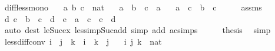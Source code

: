\begin{isabellebody}
\begin{isamarkuptext}
\end{isamarkuptext}\isamarkuptrue%
\isamarkupfalse%
\ diff{\isacharunderscore}{\kern0pt}less{\isacharunderscore}{\kern0pt}mono{\isacharcolon}{\kern0pt}\isanewline
\ \ \ a\ b\ c\ {\isacharcolon}{\kern0pt}{\isacharcolon}{\kern0pt}\ nat\isanewline
\ \ \ {\isachardoublequoteopen}a\ {\isacharless}{\kern0pt}\ b{\isachardoublequoteclose}\ \ {\isachardoublequoteopen}c\ {\isasymle}\ a{\isachardoublequoteclose}\isanewline
\ \ \ {\isachardoublequoteopen}a\ {\isacharminus}{\kern0pt}\ c\ {\isacharless}{\kern0pt}\ b\ {\isacharminus}{\kern0pt}\ c{\isachardoublequoteclose}\isanewline
%
\isadelimproof
%
\endisadelimproof
%
\isatagproof
{}\isamarkupfalse%
\ {\isacharminus}{\kern0pt}\isanewline
\ \ \isamarkupfalse%
\ assms\ \isamarkupfalse%
\ d\ e\ \ {\isachardoublequoteopen}b\ {\isacharequal}{\kern0pt}\ c\ {\isacharplus}{\kern0pt}\ {\isacharparenleft}{\kern0pt}d\ {\isacharplus}{\kern0pt}\ e{\isacharparenright}{\kern0pt}{\isachardoublequoteclose}\ \ {\isachardoublequoteopen}a\ {\isacharequal}{\kern0pt}\ c\ {\isacharplus}{\kern0pt}\ e{\isachardoublequoteclose}\ \ {\isachardoublequoteopen}d\ {\isachargreater}{\kern0pt}\ {}{\isachardoublequoteclose}\isanewline
\ \ \ \ \isamarkupfalse%
\ {\isacharparenleft}{\kern0pt}auto\ dest{\isacharbang}{\kern0pt}{\isacharcolon}{\kern0pt}\ le{\isacharunderscore}{\kern0pt}Suc{\isacharunderscore}{\kern0pt}ex\ less{\isacharunderscore}{\kern0pt}imp{\isacharunderscore}{\kern0pt}Suc{\isacharunderscore}{\kern0pt}add\ simp\ add{\isacharcolon}{\kern0pt}\ ac{\isacharunderscore}{\kern0pt}simps{\isacharparenright}{\kern0pt}\isanewline
\ \ \isamarkupfalse%
\ \isamarkupfalse%
\ {\isacharquery}{\kern0pt}thesis\ \isamarkupfalse%
\ simp\isanewline
{}\isamarkupfalse%
%
\endisatagproof
{\isafoldproof}%
%
\isadelimproof
\isanewline
%
\endisadelimproof
\isanewline
{}\isamarkupfalse%
\ less{\isacharunderscore}{\kern0pt}diff{\isacharunderscore}{\kern0pt}conv{\isacharcolon}{\kern0pt}\ {\isachardoublequoteopen}i\ {\isacharless}{\kern0pt}\ j\ {\isacharminus}{\kern0pt}\ k\ {\isasymlongleftrightarrow}\ i\ {\isacharplus}{\kern0pt}\ k\ {\isacharless}{\kern0pt}\ j{\isachardoublequoteclose}\isanewline
\ \ \ i\ j\ k\ {\isacharcolon}{\kern0pt}{\isacharcolon}{\kern0pt}\ nat\isanewline
%
\isadelimproof
\ \ %
\endisadelimproof
%

\end{isabellebody}

